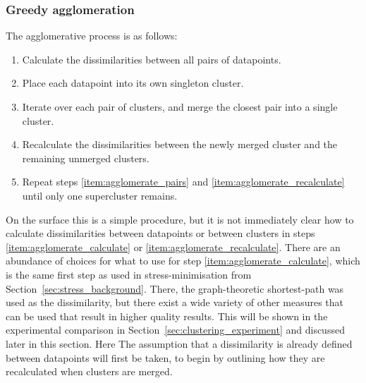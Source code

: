 \subsubsection{Greedy agglomeration}
The agglomerative process is as follows:
\begin{mdframed}[backgroundcolor=WhiteSmoke]
\begin{enumerate}[leftmargin=*]
  \item Calculate the dissimilarities between all pairs of datapoints. \label{item:agglomerate_calculate}
  \item Place each datapoint into its own singleton cluster.
  \item Iterate over each pair of clusters, and merge the closest pair into a single cluster. \label{item:agglomerate_pairs}
  \item Recalculate the dissimilarities between the newly merged cluster and the remaining unmerged clusters. \label{item:agglomerate_recalculate}
  \item Repeat steps \ref{item:agglomerate_pairs} and \ref{item:agglomerate_recalculate} until only one supercluster remains.
\end{enumerate}
\end{mdframed}
On the surface this is a simple procedure, but it is not immediately clear how to calculate dissimilarities between datapoints or between clusters in steps \ref{item:agglomerate_calculate} or \ref{item:agglomerate_recalculate}.
There are an abundance of choices for what to use for step \ref{item:agglomerate_calculate}, which is the same first step as used in stress-minimisation from Section~\ref{sec:stress_background}. There, the graph-theoretic shortest-path was used as the dissimilarity, but there exist a wide variety of other measures that can be used that result in higher quality results. This will be shown in the experimental comparison in Section~\ref{sec:clustering_experiment} and discussed later in this section. Here The assumption that a dissimilarity is already defined between datapoints will first be taken, to begin by outlining how they are recalculated when clusters are merged.

